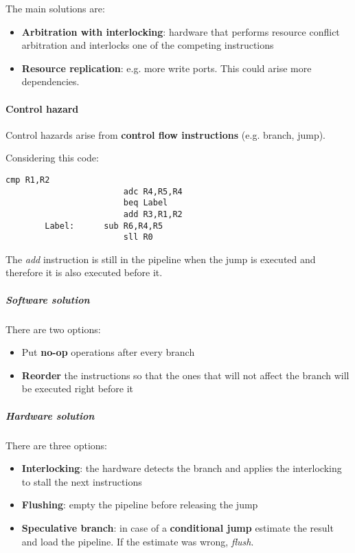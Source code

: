 The main solutions are:
\begin{itemize}
	\item \textbf{Arbitration with interlocking}: hardware that performs resource conflict arbitration and interlocks one of the competing instructions
	\item \textbf{Resource replication}: e.g. more write ports. This could arise more dependencies.
\end{itemize}

\paragraph{Control hazard}
Control hazards arise from \textbf{control flow instructions} (e.g. branch, jump).
\begin{example}
	Considering this code:
	\begin{lstlisting}[language={[x86masm]Assembler}]
						cmp R1,R2
						adc R4,R5,R4
						beq Label
						add R3,R1,R2
		Label: 		sub R6,R4,R5
						sll R0
	\end{lstlisting}
	The \textit{add} instruction is still in the pipeline when the jump is executed and therefore it is also executed before it.
	
	\subparagraph{Software solution}
	There are two options:
	\begin{itemize}[leftmargin=+1.5cm]
		\item Put \textbf{no-op} operations after every branch
		\item \textbf{Reorder} the instructions so that the ones that will not affect the branch will be executed right before it
	\end{itemize}
	\subparagraph{Hardware solution}
	There are three options:
	\begin{itemize}[leftmargin=+1.5cm]
		\item \textbf{Interlocking}: the hardware detects the branch and applies the interlocking to stall the next instructions
		\item \textbf{Flushing}: empty the pipeline before releasing the jump
		\item \textbf{Speculative branch}: in case of a \textbf{conditional jump} estimate the result and load the pipeline. If the estimate was wrong, \textit{flush}.
	\end{itemize}
\end{example}

